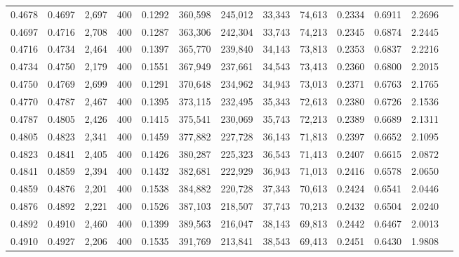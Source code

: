 \begin{tabular}{rrrrrrrrrrrrr}
0.4678 & 0.4697 &  2,697 & 400 &                                     0.1292 & 360,598 & 245,012 &  33,343 &  74,613 & 0.2334 & 0.6911 & 2.2696 \\
0.4697 & 0.4716 &  2,708 & 400 &                                     0.1287 & 363,306 & 242,304 &  33,743 &  74,213 & 0.2345 & 0.6874 & 2.2445 \\
0.4716 & 0.4734 &  2,464 & 400 &                                     0.1397 & 365,770 & 239,840 &  34,143 &  73,813 & 0.2353 & 0.6837 & 2.2216 \\
0.4734 & 0.4750 &  2,179 & 400 &                                     0.1551 & 367,949 & 237,661 &  34,543 &  73,413 & 0.2360 & 0.6800 & 2.2015 \\
0.4750 & 0.4769 &  2,699 & 400 &                                     0.1291 & 370,648 & 234,962 &  34,943 &  73,013 & 0.2371 & 0.6763 & 2.1765 \\
0.4770 & 0.4787 &  2,467 & 400 &                                     0.1395 & 373,115 & 232,495 &  35,343 &  72,613 & 0.2380 & 0.6726 & 2.1536 \\
0.4787 & 0.4805 &  2,426 & 400 &                                     0.1415 & 375,541 & 230,069 &  35,743 &  72,213 & 0.2389 & 0.6689 & 2.1311 \\
0.4805 & 0.4823 &  2,341 & 400 &                                     0.1459 & 377,882 & 227,728 &  36,143 &  71,813 & 0.2397 & 0.6652 & 2.1095 \\
0.4823 & 0.4841 &  2,405 & 400 &                                     0.1426 & 380,287 & 225,323 &  36,543 &  71,413 & 0.2407 & 0.6615 & 2.0872 \\
0.4841 & 0.4859 &  2,394 & 400 &                                     0.1432 & 382,681 & 222,929 &  36,943 &  71,013 & 0.2416 & 0.6578 & 2.0650 \\
0.4859 & 0.4876 &  2,201 & 400 &                                     0.1538 & 384,882 & 220,728 &  37,343 &  70,613 & 0.2424 & 0.6541 & 2.0446 \\
0.4876 & 0.4892 &  2,221 & 400 &                                     0.1526 & 387,103 & 218,507 &  37,743 &  70,213 & 0.2432 & 0.6504 & 2.0240 \\
0.4892 & 0.4910 &  2,460 & 400 &                                     0.1399 & 389,563 & 216,047 &  38,143 &  69,813 & 0.2442 & 0.6467 & 2.0013 \\
0.4910 & 0.4927 &  2,206 & 400 &                                     0.1535 & 391,769 & 213,841 &  38,543 &  69,413 & 0.2451 & 0.6430 & 1.9808 \\

\end{tabular}

